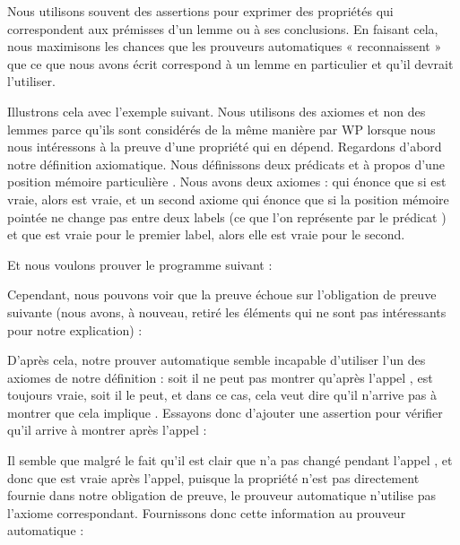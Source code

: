 

Nous utilisons souvent des assertions pour exprimer des propriétés qui
correspondent aux prémisses d'un lemme ou à ses conclusions. En faisant cela,
nous maximisons les chances que les prouveurs automatiques « reconnaissent »
que ce que nous avons écrit correspond à un lemme en particulier et qu'il
devrait l'utiliser.


Illustrons cela avec l'exemple suivant. Nous utilisons des axiomes et non des
lemmes parce qu'ils sont considérés de la même manière par WP lorsque nous nous
intéressons à la preuve d'une propriété qui en dépend. Regardons d'abord notre
définition axiomatique. Nous définissons deux prédicats  et
 à propos d'une position mémoire particulière .
Nous avons deux axiomes :  qui énonce que si 
est vraie, alors  est vraie, et un second axiome 
qui énonce que si la position mémoire pointée ne change pas entre deux labels
(ce que l'on représente par le prédicat ) et que 
est vraie pour le premier label, alors elle est vraie pour le second.





Et nous voulons prouver le programme suivant :




Cependant, nous pouvons voir que la preuve échoue sur l'obligation de preuve
suivante (nous avons, à nouveau, retiré les éléments qui ne sont pas intéressants
pour notre explication) :




D'après cela, notre prouver automatique semble incapable d'utiliser l'un des
axiomes de notre définition : soit il ne peut pas montrer qu'après l'appel
,  est toujours vraie, soit il le peut, et
dans ce cas, cela veut dire qu'il n'arrive pas à montrer que cela implique
. Essayons donc d'ajouter une assertion pour vérifier qu'il
arrive à montrer  après l'appel :






Il semble que malgré le fait qu'il est clair que  n'a pas changé
pendant l'appel , et donc que 
est vraie après l'appel, puisque la propriété n'est pas directement fournie dans
notre obligation de preuve, le prouveur automatique n'utilise pas l'axiome
 correspondant. Fournissons donc cette information au prouveur
automatique :


